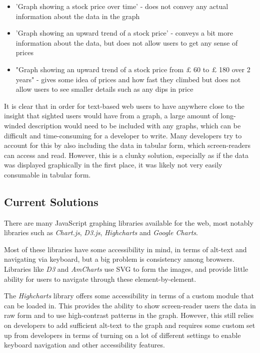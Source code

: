 \documentclass[ %
                    author={Aleena Baig},
                supervisor={Dr Simon Lock},
                    degree={BSc},
                     title={On Making Web Accessible Graphs},
                  subtitle={},
                      year={2019} ]{dissertation}
\begin{document}
\begin{itemize}
    \item 'Graph showing a stock price over time' - does not convey any actual information about the data in the graph
    \item 'Graph showing an upward trend of a stock price' - conveys a bit more information about the data, but does not allow users to get any sense of prices
    \item "Graph showing an upward trend of a stock price from $\pounds$ 60 to $\pounds$ 180 over 2 years" - gives some idea of prices and how fast they climbed but does not allow users to see smaller details such as any dips in price
\end{itemize}

It is clear that in order for text-based web users to have anywhere close to the insight that sighted users would have from a graph, a large amount of long-winded description would need to be included with any graphs, which can be difficult and time-consuming for a developer to write. Many developers try to account for this by also including the data in tabular form, which screen-readers can access and read. However, this is a clunky solution, especially as if the data was displayed graphically in the first place, it was likely not very easily consumable in tabular form.

\subsection{Current Solutions}

There are many JavaScript graphing libraries available for the web, most notably libraries such as \textit{Chart.js}, \textit{D3.js}, \textit{Highcharts} and \textit{Google Charts}.

Most of these libraries have some accessibility in mind, in terms of alt-text and navigating via keyboard, but a big problem is consistency among browsers. Libraries like \textit{D3} and \textit{AmCharts} use SVG to form the images, and provide little ability for users to navigate through these element-by-element.

The \textit{Highcharts} library offers some accessibility in terms of a custom module that can be loaded in. This provides the ability to show screen-reader users the data in raw form and to use high-contrast patterns in the graph. However, this still relies on developers to add sufficient alt-text to the graph and requires some custom set up from developers in terms of turning on a lot of different settings to enable keyboard navigation and other accessibility features.
\end{document}
